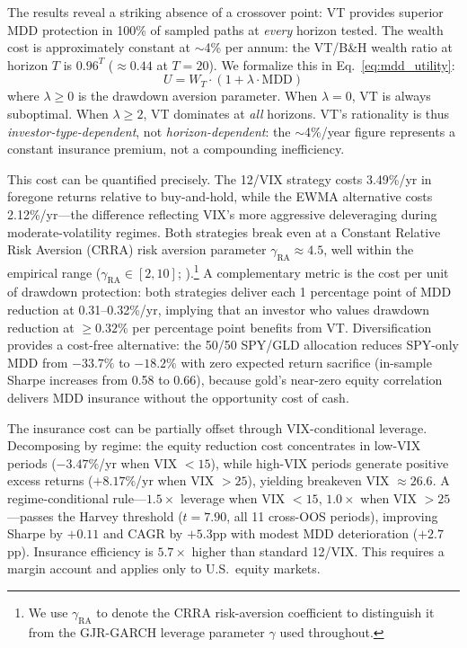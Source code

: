 The results reveal a striking absence of a crossover point: VT provides superior MDD protection in 100\% of sampled paths at \textit{every} horizon tested. The wealth cost is approximately constant at $\sim$4\% per annum: the VT/B\&H wealth ratio at horizon $T$ is $0.96^T$ ($\approx 0.44$ at $T = 20$). We formalize this in Eq.~\eqref{eq:mdd_utility}:
\begin{equation}
U = W_T \cdot (1 + \lambda \cdot \text{MDD})
\label{eq:mdd_utility}
\end{equation}
where $\lambda \geq 0$ is the drawdown aversion parameter. When $\lambda = 0$, VT is always suboptimal. When $\lambda \geq 2$, VT dominates at \textit{all} horizons. VT's rationality is thus \textit{investor-type-dependent}, not \textit{horizon-dependent}: the $\sim$4\%/year figure represents a constant insurance premium, not a compounding inefficiency.

This cost can be quantified precisely. The 12/VIX strategy costs 3.49\%/yr in foregone returns relative to buy-and-hold, while the EWMA alternative costs 2.12\%/yr---the difference reflecting VIX's more aggressive deleveraging during moderate-volatility regimes. Both strategies break even at a Constant Relative Risk Aversion (CRRA) risk aversion parameter $\gamma_{\text{RA}} \approx 4.5$, well within the empirical range ($\gamma_{\text{RA}} \in [2, 10]$; \citealt{cederburg2020}).\footnote{We use $\gamma_{\text{RA}}$ to denote the CRRA risk-aversion coefficient to distinguish it from the GJR-GARCH leverage parameter $\gamma$ used throughout.} A complementary metric is the cost per unit of drawdown protection: both strategies deliver each 1 percentage point of MDD reduction at 0.31--0.32\%/yr, implying that an investor who values drawdown reduction at $\geq 0.32\%$ per percentage point benefits from VT. Diversification provides a cost-free alternative: the 50/50 SPY/GLD allocation reduces SPY-only MDD from $-33.7\%$ to $-18.2\%$ with zero expected return sacrifice (in-sample Sharpe increases from 0.58 to 0.66), because gold's near-zero equity correlation delivers MDD insurance without the opportunity cost of cash.

The insurance cost can be partially offset through VIX-conditional leverage. Decomposing by regime: the equity reduction cost concentrates in low-VIX periods ($-3.47\%$/yr when VIX $< 15$), while high-VIX periods generate positive excess returns ($+8.17\%$/yr when VIX $> 25$), yielding breakeven VIX $\approx 26.6$. A regime-conditional rule---$1.5\times$ leverage when VIX $< 15$, $1.0\times$ when VIX $> 25$---passes the Harvey threshold ($t = 7.90$, all 11 cross-OOS periods), improving Sharpe by $+0.11$ and CAGR by $+5.3$pp with modest MDD deterioration ($+2.7$pp). Insurance efficiency is $5.7\times$ higher than standard 12/VIX. This requires a margin account and applies only to U.S.\ equity markets.

